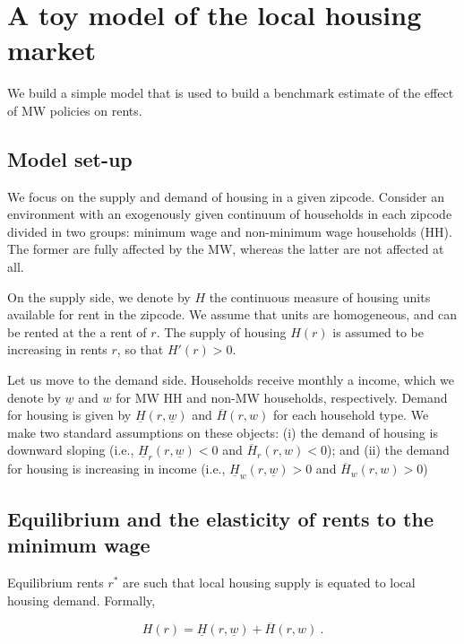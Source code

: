 \clearpage
\section{A toy model of the local housing market}\label{sec:model}

We build a simple model that is used to build a benchmark estimate of the effect of MW
policies on rents.

\subsection{Model set-up}

We focus on the supply and demand of housing in a given zipcode. Consider an environment with 
an exogenously given continuum of households in each zipcode divided in two groups: minimum wage 
and non-minimum wage households (HH). The former are fully affected by the MW, whereas the latter 
are not affected at all.

On the supply side, we denote by $H$ the continuous measure of housing units available for rent 
in the zipcode. We assume that units are homogeneous, and can be rented at the a rent of $r$. The 
supply of housing $H(r)$ is assumed to be increasing in rents $r$, so that $H'(r) > 0$.

Let us move to the demand side. Households receive monthly a income, which we denote by 
$\underline{w}$ and $w$ for MW HH and non-MW households, respectively. Demand for housing is given 
by $\underline{H}(r, \underline{w})$ and $\overline{H}(r, w)$ for each household type. We make two 
standard assumptions on these objects: (i) the demand of housing is downward sloping (i.e., 
$\underline{H}_r(r, \underline{w}) < 0$ and $\overline{H}_r(r, w) < 0$); and (ii) the demand for 
housing is increasing in income (i.e., $\underline{H}_w(r, \underline{w}) > 0$ and $\overline{H}_w(r, 
w) > 0$)


\subsection{Equilibrium and the elasticity of rents to the minimum wage}

Equilibrium rents $r^*$ are such that local housing supply is equated to local housing demand. 
Formally,

\begin{equation*}\label{eq:model-eq}
H(r) =  \underline{H}(r, \underline{w}) + \overline{H}(r, w) \ .
\end{equation*}

